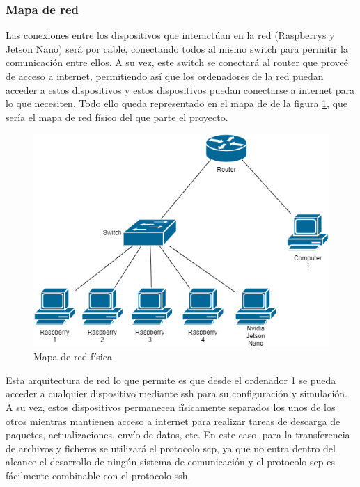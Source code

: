 \subsubsection{Mapa de red}
Las conexiones entre los dispositivos que interactúan en la red (Raspberrys y Jetson Nano) será por cable, conectando todos al mismo switch para permitir la comunicación entre ellos. A su vez, este switch se conectará al router que proveé de acceso a internet, permitiendo así que los ordenadores de la red puedan acceder a estos dispositivos y estos dispositivos puedan conectarse a internet para lo que necesiten. Todo ello queda representado en el mapa de de la figura \ref{fig:MapaRed}, que sería el mapa de red físico del que parte el proyecto.
\begin{figure}[H]
    \centering
    \includegraphics[width=\textwidth]{Figuras/Network_map.png}    
    \caption{Mapa de red física} 
    \label{fig:MapaRed}
\end{figure}

Esta arquitectura de red lo que permite es que desde el ordenador 1 se pueda acceder a cualquier dispositivo mediante ssh para su configuración y simulación. A su vez, estos dispositivos permanecen físicamente separados los unos de los otros mientras mantienen acceso a internet para realizar tareas de descarga de paquetes, actualizaciones, envío de datos, etc. En este caso, para la transferencia de archivos y ficheros se utilizará el protocolo scp, ya que no entra dentro del alcance el desarrollo de ningún sistema de comunicación y el protocolo scp es fácilmente combinable con el protocolo ssh.

\pagebreak

